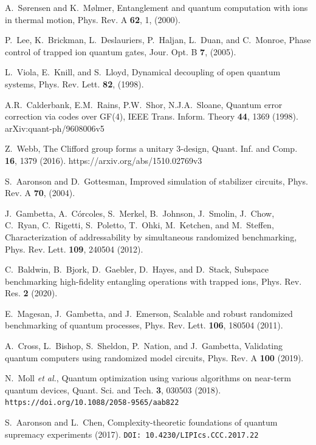 \documentclass[12pt,a4paper]{amsart}
\numberwithin{equation}{section}
\theoremstyle{plain}
\theoremstyle{definition}
\begin{document}
\begin{thebibliography}{40}
A.~S\o rensen and K.~M\o lmer, Entanglement and quantum computation with ions
  in thermal motion, Phys. Rev. A \textbf{62}, 1, (2000).

P.~Lee, K.~Brickman, L.~Deslauriers, P.~Haljan, L.~Duan, and C.~Monroe, Phase control of trapped ion quantum gates, Jour. Opt. B \textbf{7}, (2005).

L.~Viola, E.~Knill, and S.~Lloyd, Dynamical decoupling of open quantum systems, Phys. Rev. Lett. \textbf{82}, (1998).

A.R.~Calderbank, E.M.~Rains, P.W.~Shor, N.J.A.~Sloane, Quantum error correction via codes over GF(4), IEEE Trans. Inform. Theory \textbf{44}, 1369 (1998). 
arXiv:quant-ph/9608006v5 

Z.~Webb,
The Clifford group forms a unitary $3$-design, Quant. Inf. and Comp. \textbf{16}, 1379 (2016). https://arxiv.org/abs/1510.02769v3

S.~Aaronson and D.~Gottesman, Improved simulation of stabilizer circuits, Phys. Rev. A \textbf{70}, (2004).

J.~Gambetta, A.~C\'orcoles, S.~Merkel, B.~Johnson, J.~Smolin, J.~Chow, C.~Ryan,
  C.~Rigetti, S.~Poletto, T.~Ohki, M.~Ketchen, and M.~Steffen,
  Characterization of addressability by simultaneous randomized
  benchmarking, Phys. Rev. Lett. \textbf{109}, 240504 (2012).

C.~Baldwin, B.~Bjork, D.~Gaebler, D.~Hayes, and D.~Stack, Subspace
  benchmarking high-fidelity entangling operations with trapped ions, Phys. Rev. Res. \textbf{2} (2020).

E.~Magesan, J.~Gambetta, and J.~Emerson, Scalable and robust randomized benchmarking of quantum processes, Phys. Rev. Lett. \textbf{106}, 180504 (2011).

A.~Cross, L.~Bishop, S.~Sheldon, P.~Nation, and J.~Gambetta, Validating quantum computers using randomized model circuits, Phys. Rev. A \textbf{100} (2019).
  
N.~Moll \textit{et al.},
Quantum optimization using various algorithms on near-term quantum devices, Quant. Sci. and Tech. \textbf{3}, 030503 (2018).
\texttt{https://doi.org/10.1088/2058-9565/aab822}

S.~Aaronson and L.~Chen, Complexity-theoretic foundations of quantum supremacy experiments (2017). \texttt{DOI: 10.4230/LIPIcs.CCC.2017.22}


\end{thebibliography}
\end{document}
